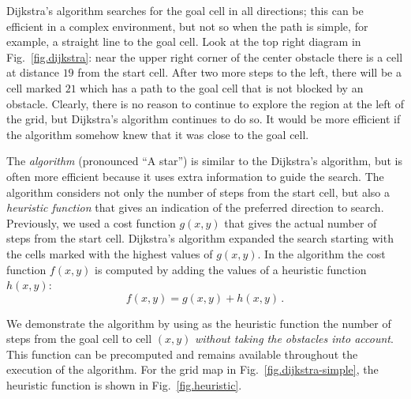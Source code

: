 Dijkstra's algorithm searches for the goal cell in all directions; this can be efficient in a complex environment, but not so when the path is simple, for example, a straight line to the goal cell. Look at the top right diagram in Fig.~\ref{fig.dijkstra}: near the upper right corner of the center obstacle there is a cell at distance $19$ from the start cell. After two more steps to the left, there will be a cell marked $21$ which has a path to the goal cell that is not blocked by an obstacle. Clearly, there is no reason to continue to explore the region at the left of the grid, but Dijkstra's algorithm continues to do so. It would be more efficient if the algorithm somehow knew that it was close to the goal cell.

The \emph{\astar{} algorithm} (pronounced ``A star'') is similar to the Dijkstra's algorithm, but is often more efficient because it uses extra information to guide the search. The \astar{} algorithm considers not only the number of steps from the start cell, but also a \emph{heuristic function} that gives an indication of the preferred direction to search. Previously, we used a cost function $g(x,y)$ that gives the actual number of steps from the start cell. Dijkstra's algorithm expanded the search starting with the cells marked with the highest values of $g(x,y)$. In the \astar{} algorithm the cost function $f(x,y)$ is computed by adding the values of a heuristic function $h(x,y)$:
\[
f(x,y) = g(x,y) + h(x,y)\,.
\]

We demonstrate the \astar{} algorithm by using as the heuristic function the number of steps from the goal cell  to cell $(x,y)$ \emph{without taking the obstacles into account}. This function can be precomputed and remains available throughout the execution of the algorithm. For the grid map in Fig.~\ref{fig.dijkstra-simple}, the heuristic function is shown in Fig.~\ref{fig.heuristic}.

